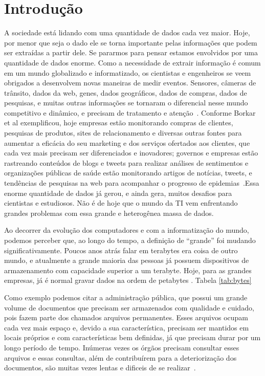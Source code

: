 \chapter{Introdução}
A sociedade está lidando com uma quantidade de dados cada vez maior. Hoje, por menor que seja o dado ele se torna importante pelas informações que podem ser extraídas a partir dele. Se pararmos para pensar estamos envolvidos por uma quantidade de dados enorme. Como a necessidade de extrair informação é comum em um mundo globalizado e informatizado,  os cientistas e engenheiros se veem obrigados a desenvolvem novas maneiras de medir eventos. Sensores, câmeras de trânsito, dados da web, genes, dados geográficos, dados de compras, dados de pesquisas, e muitas outras informações se tornaram o diferencial nesse mundo competitivo e dinâmico, e precisam de tratamento e atenção~\cite{initBigData}. Conforme Borkar et al exemplificou, hoje empresas estão monitorando compras de clientes, pesquisas de produtos, sites de relacionamento e diversas outras fontes para aumentar a eficácia do seu marketing e dos serviços ofertados aos clientes, que cada vez mais precisam ser diferenciados e inovadores; governos e empresas estão rastreando conteúdos de blogs e tweets para realizar análises de sentimentos e organizações públicas de saúde estão monitorando artigos de notícias, tweets, e tendências de pesquisas na web para acompanhar o progresso de epidemias~\cite{WNextBigData}.Essa enorme quantidade de dados já gerou, e ainda gera, muitos desafios para cientistas e estudiosos. Não é de hoje que o mundo da TI vem enfrentando grandes problemas com essa grande e heterogênea massa de dados.

Ao decorrer da evolução dos computadores e com a informatização do mundo, podemos perceber que, ao longo do tempo, a definição de “grande” foi mudando significativamente. Poucos anos atrás falar em terabytes era coisa de outro mundo, e atualmente a grande maioria das pessoas já possuem dispositivos de armazenamento com capacidade superior a um terabyte. Hoje, para as grandes empresas, já é normal gravar dados na ordem de petabytes . Tabela \ref{tab:bytes}

Como exemplo podemos citar a administração pública, que possui um grande volume de documentos que precisam ser armazenados com qualidade e cuidado, pois fazem parte dos chamados arquivos permanentes. Esses arquivos ocupam cada vez mais espaço e, devido a sua característica, precisam ser mantidos em locais próprios e com características bem definidas, já que precisam durar por um longo período de tempo. Inúmeras vezes os órgãos precisam consultar esses arquivos e essas consultas, além de contribuírem para a deteriorização dos documentos, são muitas vezes lentas e dificeis de se realizar~\cite{arqConarq}.

